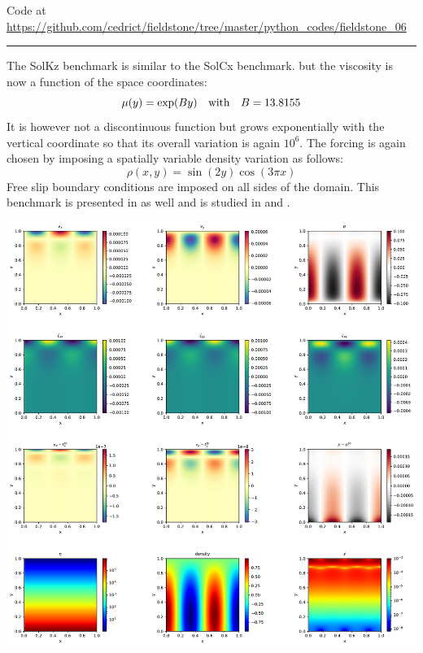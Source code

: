 

\begin{center}
Code at \url{https://github.com/cedrict/fieldstone/tree/master/python_codes/fieldstone_06}
\end{center}

\par\noindent\rule{\textwidth}{0.4pt}

The SolKz benchmark \cite{repa87} is similar to the SolCx benchmark.
but the viscosity is now a function of the space coordinates: 
\begin{equation}
\mu(y)=\exp(By) \quad {\rm with} \quad B=13.8155
\end{equation}
It is however not a discontinuous function but grows exponentially with the vertical coordinate so that its overall variation is again $10^6$. 
The forcing is again chosen by imposing a spatially variable density variation as follows:
\begin{equation}
\rho(x,y)=\sin(2y) \cos(3\pi x)
\end{equation}
Free slip boundary conditions are imposed on all sides of the domain.
This benchmark is presented in \cite{zhon96} as well and is studied in \cite{dumg11} and \cite{gemd13}.

\includegraphics[width=14cm]{python_codes/fieldstone_06/results/solution.pdf}

